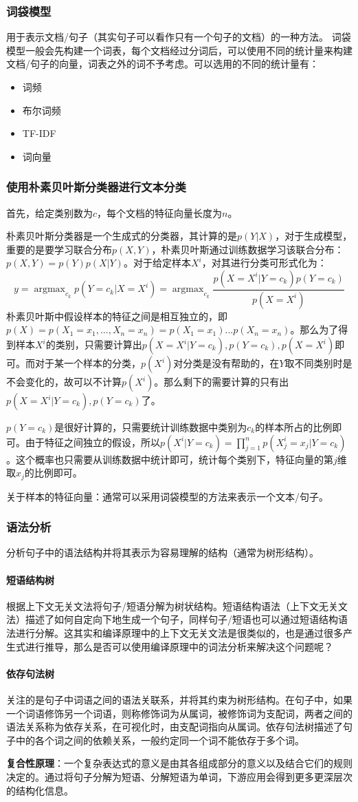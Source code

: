 \subsubsection{词袋模型}
用于表示文档/句子（其实句子可以看作只有一个句子的文档）的一种方法。
词袋模型一般会先构建一个词表，每个文档经过分词后，可以使用不同的统计量来构建文档/句子的向量，词表之外的词不予考虑。可以选用的不同的统计量有：
\begin{itemize}
	\item 词频
	\item 布尔词频
	\item TF-IDF
	\item 词向量
\end{itemize}

\subsubsection{使用朴素贝叶斯分类器进行文本分类}
首先，给定类别数为$c$，每个文档的特征向量长度为$n$。

朴素贝叶斯分类器是一个生成式的分类器，其计算的是$p(Y | X)$，对于生成模型，重要的是要学习联合分布$p(X, Y)$，朴素贝叶斯通过训练数据学习该联合分布：$p(X, Y) = p(Y)p(X|Y)$。对于给定样本$X^i$，对其进行分类可形式化为：
$$
y = \mathop{argmax}_{c_k} p(Y=c_k | X=X^i) = \mathop{argmax}_{c_k} \frac{p(X=X^i | Y=c_k) p(Y=c_k)}{p(X=X^i)}
$$
朴素贝叶斯中假设样本的特征之间是相互独立的，即$p(X)=p(X_1=x_1, ..., X_n=x_n) = p(X_1=x_1) ... p(X_n=x_n)$。那么为了得到样本$X^i$的类别，只需要计算出$p(X=X^i | Y=c_k),  p(Y=c_k), p(X=X^i)$即可。而对于某一个样本的分类，$p(X^i)$对分类是没有帮助的，在$Y$取不同类别时是不会变化的，故可以不计算$p(X^i)$。那么剩下的需要计算的只有出$p(X=X^i | Y=c_k),  p(Y=c_k)$了。

$p(Y=c_k)$是很好计算的，只需要统计训练数据中类别为$c_k$的样本所占的比例即可。由于特征之间独立的假设，所以$p(X^i | Y=c_k) = \prod_{j=1}^{n} p(X_{j}^{i}=x_j | Y=c_k)$。这个概率也只需要从训练数据中统计即可，统计每个类别下，特征向量的第$j$维取$x_j$的比例即可。

关于样本的特征向量：通常可以采用词袋模型的方法来表示一个文本/句子。

\subsubsection{语法分析}
分析句子中的语法结构并将其表示为容易理解的结构（通常为树形结构）。
\paragraph{短语结构树}根据上下文无关文法将句子/短语分解为树状结构。短语结构语法（上下文无关文法）描述了如何自定向下地生成一个句子，同样句子/短语也可以通过短语结构语法进行分解。这其实和编译原理中的上下文无关文法是很类似的，也是通过很多产生式进行推导，那么是否可以使用编译原理中的词法分析来解决这个问题呢？

\paragraph{依存句法树}关注的是句子中词语之间的语法关联系，并将其约束为树形结构。在句子中，如果一个词语修饰另一个词语，则称修饰词为从属词，被修饰词为支配词，两者之间的语法关系称为依存关系，在可视化时，由支配词指向从属词。依存句法树描述了句子中的各个词之间的依赖关系，一般约定同一个词不能依存于多个词。

\textbf{复合性原理}：一个复杂表达式的意义是由其各组成部分的意义以及结合它们的规则决定的。通过将句子分解为短语、分解短语为单词，下游应用会得到更多更深层次的结构化信息。
